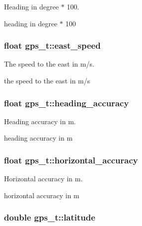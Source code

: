 Heading in degree $\ast$ 100. 

heading in degree $\ast$ 100 \hypertarget{structgps__t_aec49e46c78d21a3fb4f230585afc045e}{
\subsubsection[{east\+\_\+speed}]{\setlength{\rightskip}{0pt plus 5cm}float gps\+\_\+t\+::east\+\_\+speed}}\label{structgps__t_aec49e46c78d21a3fb4f230585afc045e}


The speed to the east in m/s. 

the speed to the east in m/s \hypertarget{structgps__t_a04072a8af0b17a88a8a8fdede6ab5555}{
\subsubsection[{heading\+\_\+accuracy}]{\setlength{\rightskip}{0pt plus 5cm}float gps\+\_\+t\+::heading\+\_\+accuracy}}\label{structgps__t_a04072a8af0b17a88a8a8fdede6ab5555}


Heading accuracy in m. 

heading accuracy in m \hypertarget{structgps__t_ae7f7b21657d1adb7038bd3933d4a81c3}{
\subsubsection[{horizontal\+\_\+accuracy}]{\setlength{\rightskip}{0pt plus 5cm}float gps\+\_\+t\+::horizontal\+\_\+accuracy}}\label{structgps__t_ae7f7b21657d1adb7038bd3933d4a81c3}


Horizontal accuracy in m. 

horizontal accuracy in m \hypertarget{structgps__t_af54fe11cbde7878a0727616f24dd8fc7}{
\subsubsection[{latitude}]{\setlength{\rightskip}{0pt plus 5cm}double gps\+\_\+t\+::latitude}}\label{structgps__t_af54fe11cbde7878a0727616f24dd8fc7}


